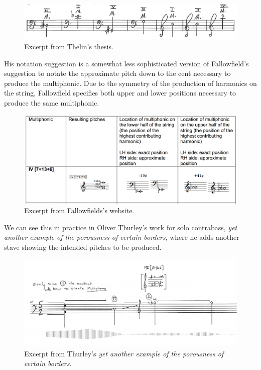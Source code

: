 \begin{figure}
    \includegraphics[width=\linewidth]{./resources/thelinMultiphonicNotation.png}
    \caption{Excerpt from Thelin's thesis.}
  \label{fig:Excerpt from Thelin's thesis}
  \end{figure}
His notation suggestion is a somewhat less sophisticated version of Fallowfield's suggestion to notate the approximate pitch down to the cent necessary to produce the multiphonic. Due to the symmetry of the production of harmonics on the string, Fallowfield specifies both upper and lower positions necessary to produce the same multiphonic.\autocite[index/the-string/multiphonics-and-other-multiple-sounds/fingeringcharts.html]{fallowfieldCelloMap}
\begin{figure}
    \includegraphics[width=\linewidth]{./resources/fallowfieldMultiphonicFingering.png}
    \caption{Excerpt from Fallowfields's website.}
\label{fig:Excerpt from Fallowfields's website}
  \end{figure}

  We can see this in practice in Oliver Thurley's work for solo contrabass, \emph{yet another example of the porousness of certain borders}, where he adds another stave showing the intended pitches to be produced.\autocite{thurleyAnotherExamplePorousness2014}

  \begin{figure}
    \includegraphics[width=\linewidth]{./resources/thurleyMultiphonicNotation.png}
    \caption{Excerpt from Thurley's \emph{yet another example of the porousness of certain borders}.}
\label{fig:Excerpt from Thurley's `yet another example of the porousness of certain borders'}
  \end{figure}

